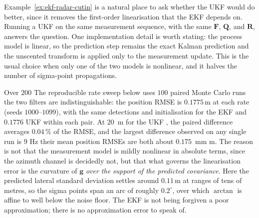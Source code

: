 \documentclass[graybox,envcountchap]{style/SNmono}
\providecommand{\DIFadd}[1]{{\protect\color{blue} #1}} %
\providecommand{\DIFdel}[1]{{\protect\color{red} #1}} %
\providecommand{\DIFaddbegin}{} %
\providecommand{\DIFaddend}{} %
\providecommand{\DIFdelbegin}{} %
\providecommand{\DIFdelend}{} %
\begin{document}
\begin{example}
\label{ex:ukf-radar-cutin}
Example~\ref{ex:ekf-radar-cutin} is a natural place to ask whether the UKF
would do better, since it removes the first-order linearisation that the EKF
depends on. Running a UKF on the same measurement sequence, with the same
$\mathbf{F}$, $\mathbf{Q}$, and $\mathbf{R}$, answers the question. One
implementation detail is worth stating: the process model is linear, so the
prediction step remains the exact Kalman prediction and the unscented transform
is applied only to the measurement update. This is the usual choice when only
one of the two models is nonlinear, and it halves the number of sigma-point
propagations.

\DIFdelbegin \DIFdel{Over $200$ }\DIFdelend \DIFaddbegin \DIFadd{The reproducible rate sweep below uses $100$ paired }\DIFaddend Monte Carlo runs \DIFdelbegin \DIFdel{the two filters are indistinguishable: the position
RMSE is $0.1775$\,m }\DIFdelend \DIFaddbegin \DIFadd{at each rate (seeds $1000$--$1099$), with the same detections and initialisation }\DIFaddend for the EKF and \DIFdelbegin \DIFdel{$0.1776$}\DIFdelend \DIFaddbegin \DIFadd{UKF within each pair. At $20$}\DIFaddend \,\DIFdelbegin \DIFdel{m for the UKF , the paired
difference averages $0.04\,\%$ of the RMSE, and the largest difference observed
on any single run is $9$}\DIFdelend \DIFaddbegin \DIFadd{Hz their mean position RMSEs are both about $0.175$}\DIFaddend \,\DIFdelbegin \DIFdel{mm}\DIFdelend \DIFaddbegin \DIFadd{m}\DIFaddend . The reason is not that the measurement model is
mildly nonlinear in absolute terms, since the azimuth channel is decidedly not,
but that what governs the linearisation error is the curvature of
$\mathbf{g}$ \emph{over the support of the predicted covariance}. Here the
predicted lateral standard deviation settles around $0.11$\,m at ranges of tens
of metres, so the sigma points span an arc of roughly $0.2^{\circ}$, over which
$\arctan$ is affine to well below the noise floor. The EKF is not being
forgiven a poor approximation; there is no approximation error to speak of.


\end{example}
\end{document}
